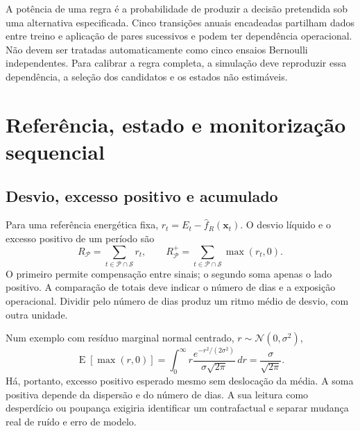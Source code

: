 A potência de uma regra é a probabilidade de produzir a decisão pretendida sob uma alternativa especificada. Cinco transições anuais encadeadas partilham dados entre treino e aplicação de pares sucessivos e podem ter dependência operacional. Não devem ser tratadas automaticamente como cinco ensaios Bernoulli independentes. Para calibrar a regra completa, a simulação deve reproduzir essa dependência, a seleção dos candidatos e os estados não estimáveis.


\section{Referência, estado e monitorização sequencial}
\label{sec:mat-monitorizacao}

\subsection{Desvio, excesso positivo e acumulado}
\label{sec:mat-excesso}
Para uma referência energética fixa, $r_t=E_t-\widehat f_R(\boldsymbol x_t)$. O desvio líquido e o excesso positivo de um período são
\begin{equation}
R_{\mathcal P}=\sum_{t\in\mathcal P\cap\mathcal S}r_t,
\qquad R_{\mathcal P}^{+}=\sum_{t\in\mathcal P\cap\mathcal S}\max(r_t,0).
\label{eq:mat-acumulados}
\end{equation}
O primeiro permite compensação entre sinais; o segundo soma apenas o lado positivo. A comparação de totais deve indicar o número de dias e a exposição operacional. Dividir pelo número de dias produz um ritmo médio de desvio, com outra unidade.

Num exemplo com resíduo marginal normal centrado, $r\sim\mathcal N(0,\sigma^2)$,
\begin{equation}
\operatorname{E}[\max(r,0)]=\int_0^\infty r\frac{e^{-r^2/(2\sigma^2)}}{\sigma\sqrt{2\pi}}\,dr
=\frac{\sigma}{\sqrt{2\pi}}.
\label{eq:mat-excesso-ruido}
\end{equation}
Há, portanto, excesso positivo esperado mesmo sem deslocação da média. A soma positiva depende da dispersão e do número de dias. A sua leitura como desperdício ou poupança exigiria identificar um contrafactual e separar mudança real de ruído e erro de modelo.

